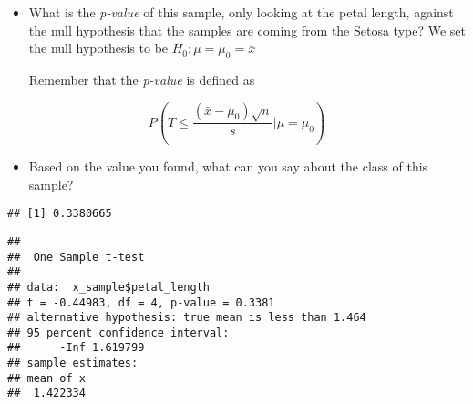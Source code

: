 \documentclass[
  oneside]{book}
\newenvironment{Shaded}{\begin{snugshade}}{\end{snugshade}}
\newcommand{\AttributeTok}[1]{\textcolor[rgb]{0.77,0.63,0.00}{#1}}
\newcommand{\CommentTok}[1]{\textcolor[rgb]{0.56,0.35,0.01}{\textit{#1}}}
\newcommand{\DecValTok}[1]{\textcolor[rgb]{0.00,0.00,0.81}{#1}}
\newcommand{\FunctionTok}[1]{\textcolor[rgb]{0.00,0.00,0.00}{#1}}
\newcommand{\NormalTok}[1]{#1}
\newcommand{\OtherTok}[1]{\textcolor[rgb]{0.56,0.35,0.01}{#1}}
\newcommand{\SpecialCharTok}[1]{\textcolor[rgb]{0.00,0.00,0.00}{#1}}
\newcommand{\StringTok}[1]{\textcolor[rgb]{0.31,0.60,0.02}{#1}}
\providecommand{\tightlist}{%
  \setlength{\itemsep}{0pt}\setlength{\parskip}{0pt}}
\begin{document}
\begin{itemize}
\item
  What is the \emph{p-value} of this sample, only looking at the
  petal length, against the null hypothesis that the
  samples are coming from the Setosa type? We set the null
  hypothesis to be \(H_0: \mu = \mu_0 = \bar{x}\)

  Remember that the \emph{p-value} is defined as
\end{itemize}

\[ P\left(T \leq \frac{(\bar{x} - \mu_0)\sqrt{n}}{s} | \mu = \mu_0\right)\]

\begin{itemize}
\tightlist
\item
  Based on the value you found, what can you say
  about the class of this sample?
\end{itemize}

\begin{Shaded}
\end{Shaded}

\begin{verbatim}
## [1] 0.3380665
\end{verbatim}

\begin{Shaded}
\end{Shaded}

\begin{verbatim}
## 
##  One Sample t-test
## 
## data:  x_sample$petal_length
## t = -0.44983, df = 4, p-value = 0.3381
## alternative hypothesis: true mean is less than 1.464
## 95 percent confidence interval:
##      -Inf 1.619799
## sample estimates:
## mean of x 
##  1.422334
\end{verbatim}
\end{document}
